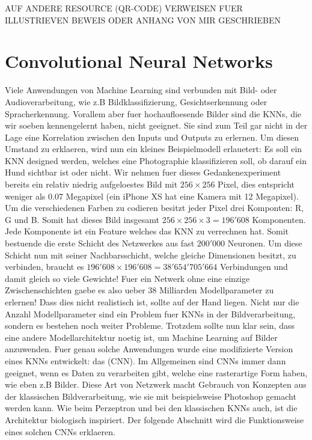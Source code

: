 AUF ANDERE RESOURCE (QR-CODE) VERWEISEN FUER ILLUSTRIEVEN BEWEIS ODER ANHANG VON
MIR GESCHRIEBEN

\cite{wiki:uat}


\pagebreak
\chapter{Convolutional Neural Networks}
Viele Anwendungen von Machine Learning sind verbunden mit Bild- oder
Audioverarbeitung, wie z.B Bildklassifizierung, Gesichtserkennung oder
Spracherkennung.
Vorallem aber fuer hochaufloesende Bilder sind die KNNs, die wir soeben
kennengelernt haben, nicht geeignet. Sie sind zum Teil gar nicht in der
Lage eine Korrelation zwischen den Inputs und Outputs zu erlernen.
Um diesen Umstand zu erklaeren, wird nun ein kleines Beispielmodell erlauetert:
\para{}
\label{sec:CNN_parameter_problem}
Es soll ein KNN designed werden, welches eine Photographie klassifizieren
soll, ob darauf ein Hund sichtbar ist oder nicht. Wir nehmen fuer dieses
Gedankenexperiment bereits ein relativ niedrig aufgeloestes Bild mit $256 \times 256$
Pixel, dies entspricht weniger als $0.07$ Megapixel (ein iPhone XS hat eine Kamera mit
12 Megapixel). Um die verschiedenen Farben zu codieren besitzt jeder Pixel drei Komponten: R, G
und B. Somit hat dieses Bild insgesamt $256 \times 256 \times 3 = 196'608$
Komponenten. Jede Komponente ist ein Feature welches das KNN zu verrechnen hat. Somit bestuende
die erste Schicht des Netzwerkes aus fast $200'000$ Neuronen. Um diese Schicht
nun mit seiner Nachbarsschicht, welche gleiche Dimensionen besitzt, zu verbinden, braucht
es $196'608 \times 196'608 = 38'654'705'664$ Verbindungen und damit gleich so
viele Gewichte! Fuer ein Netwerk ohne eine einzige Zwischenschichten gaebe es
also ueber 38 Milliarden Modellparameter zu erlernen! Dass dies nicht realistisch ist,
sollte auf der Hand liegen.
\para{}
Nicht nur die Anzahl Modellparameter sind ein Problem fuer KNNs in der
Bildverarbeitung, sondern es bestehen noch weiter Probleme.
Trotzdem sollte nun klar sein, dass eine andere Modellarchitektur noetig ist, um Machine
Learning auf Bilder anzuwenden. Fuer genau solche Anwendungen wurde eine modifizierte
Version eines KNNs entwickelt: das  (CNN).
Im Allgemeinen sind CNNs immer dann geeignet, wenn es Daten zu verarbeiten gibt, welche eine
rasterartige Form haben, wie eben z.B Bilder.
Diese Art von Netzwerk macht Gebrauch von Konzepten aus der klassischen
Bildverarbeitung, wie sie mit beispielsweise Photoshop gemacht werden kann.
Wie beim Perzeptron und bei den klassischen KNNs auch, ist die Architektur
biologisch inspiriert.
Der folgende Abschnitt wird die Funktionsweise eines solchen CNNs erklaeren.
\para{}
\cite{Goodfellow-et-al-2016}
\cite{deeplearning.ai:cnn}
\cite{wiki:cnn}


